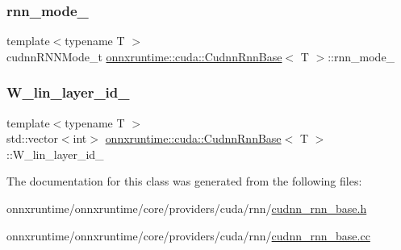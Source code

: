 \mbox{\label{classonnxruntime_1_1cuda_1_1CudnnRnnBase_a4d560327ff9db8d163c70c1db681ae2c}} 
\subsubsection{\texorpdfstring{rnn\+\_\+mode\+\_\+}{rnn\_mode\_}}
{\footnotesize\ttfamily template$<$typename T $>$ \\
cudnn\+R\+N\+N\+Mode\+\_\+t \mbox{\hyperlink{classonnxruntime_1_1cuda_1_1CudnnRnnBase}{onnxruntime\+::cuda\+::\+Cudnn\+Rnn\+Base}}$<$ T $>$\+::rnn\+\_\+mode\+\_\+\hspace{0.3cm}{\ttfamily [protected]}}

\mbox{\label{classonnxruntime_1_1cuda_1_1CudnnRnnBase_a5238bfaa798ff8e995650b1239ec1562}} 
\subsubsection{\texorpdfstring{W\+\_\+lin\+\_\+layer\+\_\+id\+\_\+}{W\_lin\_layer\_id\_}}
{\footnotesize\ttfamily template$<$typename T $>$ \\
std\+::vector$<$int$>$ \mbox{\hyperlink{classonnxruntime_1_1cuda_1_1CudnnRnnBase}{onnxruntime\+::cuda\+::\+Cudnn\+Rnn\+Base}}$<$ T $>$\+::W\+\_\+lin\+\_\+layer\+\_\+id\+\_\+\hspace{0.3cm}{\ttfamily [protected]}}



The documentation for this class was generated from the following files\+:\begin{DoxyCompactItemize}
\item 
onnxruntime/onnxruntime/core/providers/cuda/rnn/\mbox{\hyperlink{cudnn__rnn__base_8h}{cudnn\+\_\+rnn\+\_\+base.\+h}}\item 
onnxruntime/onnxruntime/core/providers/cuda/rnn/\mbox{\hyperlink{cudnn__rnn__base_8cc}{cudnn\+\_\+rnn\+\_\+base.\+cc}}\end{DoxyCompactItemize}
